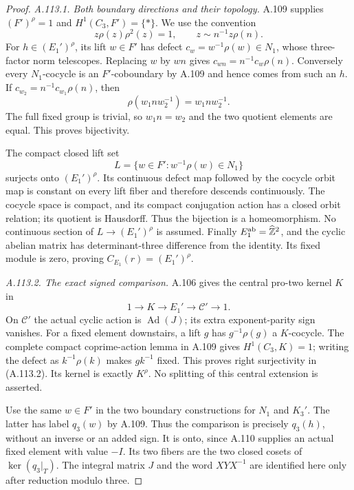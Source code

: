 \begin{proof}
\emph{A.113.1. Both boundary directions and their topology.}
A.109 supplies \((F')^\rho=1\) and \(H^1(C_3,F')=\{*\}\).
We use the convention
\[
 z\rho(z)\rho^2(z)=1,\qquad z\sim n^{-1}z\rho(n).
\]
For \(h\in(E_1')^\rho\), its lift \(w\in F'\) has defect
\(c_w=w^{-1}\rho(w)\in N_1\), whose three-factor norm telescopes.
Replacing \(w\) by \(wn\) gives
\(c_{wn}=n^{-1}c_w\rho(n)\).
Conversely every \(N_1\)-cocycle is an \(F'\)-coboundary by
A.109 and hence comes from such an \(h\).
If \(c_{w_2}=n^{-1}c_{w_1}\rho(n)\), then
\[
                 \rho(w_1nw_2^{-1})=w_1nw_2^{-1}.
\]
The full fixed group is trivial, so \(w_1n=w_2\) and the
two quotient elements are equal. This proves bijectivity.

The compact closed lift set
\[
       L=\{w\in F':w^{-1}\rho(w)\in N_1\}
\]
surjects onto \((E_1')^\rho\). Its continuous defect map followed
by the cocycle orbit map is constant on every lift fiber and
therefore descends continuously. The cocycle space is compact,
and its compact conjugation action has a closed orbit relation;
its quotient is Hausdorff. Thus the bijection is a homeomorphism.
No continuous section of \(L\to(E_1')^\rho\) is assumed.
Finally \(E_1^{\rm ab}=\widehat{\mathbb Z}^2\), and the cyclic
abelian matrix has determinant-three difference from the identity.
Its fixed module is zero, proving \(C_{E_1}(r)=(E_1')^\rho\).

\emph{A.113.2. The exact signed comparison.}
A.106 gives the central pro-two kernel \(K\) in
\[
                 1\to K\to E_1'\to\mathcal C'\to1.
\]
On \(\mathcal C'\) the actual cyclic action is
\(\operatorname{Ad}(J)\); its extra exponent-parity sign vanishes.
For a fixed element downstairs, a lift \(g\) has
\(g^{-1}\rho(g)\) a \(K\)-cocycle.
The complete compact coprime-action lemma in A.109 gives
\(H^1(C_3,K)=1\); writing the defect as \(k^{-1}\rho(k)\)
makes \(gk^{-1}\) fixed. This proves right surjectivity in
(A.113.2). Its kernel is exactly \(K^\rho\).
No splitting of this central extension is asserted.

Use the same \(w\in F'\) in the two boundary constructions for
\(N_1\) and \(K_3'\). The latter has label \(q_3(w)\) by A.109.
Thus the comparison is precisely \(q_3(h)\), without an inverse
or an added sign. It is onto, since A.110 supplies an actual
fixed element with value \(-I\). Its two fibers are the two
closed cosets of \(\ker(q_3|_T)\).
The integral matrix \(J\) and the word \(XYX^{-1}\) are
identified here only after reduction modulo three.


\end{proof}

